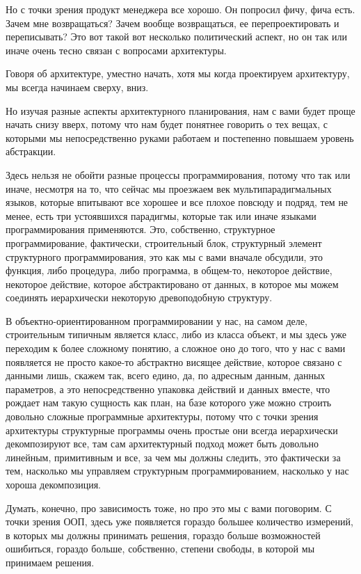 Но с точки зрения продукт менеджера все хорошо. Он попросил фичу, фича есть. Зачем мне возвращаться? Зачем вообще возвращаться, ее перепроектировать и переписывать? Это вот такой вот несколько политический аспект, но он так или иначе очень тесно связан с вопросами архитектуры.

Говоря об архитектуре, уместно начать, хотя мы когда проектируем архитектуру, мы всегда начинаем сверху, вниз.

Но изучая разные аспекты архитектурного планирования, нам с вами будет проще начать снизу вверх, потому что нам будет понятнее говорить о тех вещах, с которыми мы непосредственно руками работаем и постепенно повышаем уровень абстракции.

Здесь нельзя не обойти разные процессы программирования, потому что так или иначе, несмотря на то, что сейчас мы проезжаем век мультипарадигмальных языков, которые впитывают все хорошее и все плохое повсюду и подряд, тем не менее, есть три устоявшихся парадигмы, которые так или иначе языками программирования применяются. Это, собственно, структурное программирование, фактически, строительный блок, структурный элемент структурного программирования, это как мы с вами вначале обсудили, это функция, либо процедура, либо программа, в общем-то, некоторое действие, некоторое действие, которое абстрактировано от данных, в которое мы можем соединять иерархически некоторую древоподобную структуру.

В объектно-ориентированном программировании у нас, на самом деле, строительным типичным является класс, либо из класса объект, и мы здесь уже переходим к более сложному понятию, а сложное оно до того, что у нас с вами появляется не просто какое-то абстрактно висящее действие, которое связано с данными лишь, скажем так, всего едино, да, по адресным данным, данных параметров, а это непосредственно упаковка действий и данных вместе, что рождает нам такую сущность как план, на базе которого уже можно строить довольно сложные программные архитектуры, потому что с точки зрения архитектуры структурные программы очень простые они всегда иерархически декомпозируют все,  там сам архитектурный подход может быть довольно линейным, примитивным и все, за чем мы должны следить, это фактически за тем, насколько мы управляем структурным программированием, насколько у нас хороша декомпозиция.

Думать, конечно, про зависимость тоже, но про это мы с вами поговорим. С точки зрения ООП, здесь уже появляется гораздо большее количество измерений, в которых мы должны принимать решения, гораздо больше возможностей ошибиться, гораздо больше, собственно, степени свободы, в которой мы принимаем решения.

